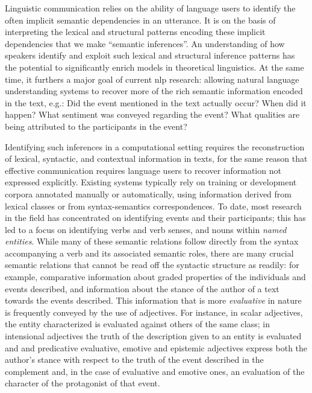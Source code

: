 \documentclass[10pt]{article}
\begin{document}
%
Linguistic communication relies on the ability of language users to identify the often implicit semantic dependencies in an utterance. It is on the basis of 
interpreting the lexical and structural  patterns encoding these implicit dependencies that we make ``semantic inferences''. An understanding of how speakers identify and exploit such lexical and structural inference patterns has the potential to significantly enrich models in theoretical linguistics. 
At the same time, it furthers a major goal of current {\sc nlp} research: allowing natural language understanding systems to recover more of the rich semantic information encoded in the text, e.g.: Did the event mentioned in the text actually occur? When did it happen? What sentiment was conveyed regarding the event? What qualities are being attributed to the participants in the event? 

Identifying such inferences in a computational setting requires the reconstruction of lexical, syntactic, and contextual information in texts, for the same reason that effective communication requires language users to recover information not expressed explicitly. Existing systems typically rely on training or development corpora annotated manually or automatically, using information derived from lexical classes or from syntax-semantics correspondences.
To date, most research in the field has concentrated on identifying events and their participants; this has led to a focus on identifying verbs and verb senses, and nouns within {\it named entities}. While many of these semantic relations follow directly from the syntax accompanying a verb and its associated semantic roles, there are many crucial semantic relations that cannot be read off the syntactic structure as readily: for example, comparative information about graded properties of the  individuals and events described, and information about the stance of the author of a text towards the events described. This information that is more \emph{evaluative} in nature is frequently conveyed by the use of adjectives. For instance, in scalar adjectives, the entity characterized is evaluated against others of the same class; in intensional adjectives the truth of the description given to an entity is evaluated and and predicative evaluative, emotive and epistemic adjectives express both the author's stance with respect to the truth of the event described in the complement and, in the case of evaluative and emotive ones, an evaluation of the character of the protagonist of that event. 
\end{document}
